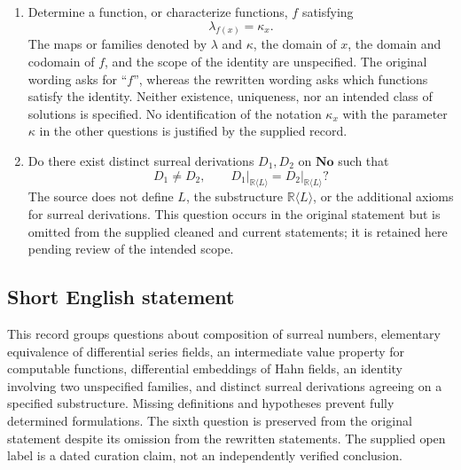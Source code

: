 \documentclass[11pt]{article}
\begin{document}
\begin{enumerate}
\item Determine a function, or characterize functions, \(f\) satisfying
\[
\lambda_{f(x)}=\kappa_x.
\]
The maps or families denoted by \(\lambda\) and \(\kappa\), the domain of \(x\), the domain and codomain of \(f\), and the scope of the identity are unspecified. The original wording asks for ``\(f\)'', whereas the rewritten wording asks which functions satisfy the identity. Neither existence, uniqueness, nor an intended class of solutions is specified. No identification of the notation \(\kappa_x\) with the parameter \(\kappa\) in the other questions is justified by the supplied record.

\item Do there exist distinct surreal derivations \(D_1,D_2\) on \(\mathbf{No}\) such that
\[
D_1\ne D_2,
\qquad
D_1\big|_{\mathbb{R}\langle L\rangle}
 =D_2\big|_{\mathbb{R}\langle L\rangle}?
\]
The source does not define \(L\), the substructure \(\mathbb{R}\langle L\rangle\), or the additional axioms for surreal derivations. This question occurs in the original statement but is omitted from the supplied cleaned and current statements; it is retained here pending review of the intended scope.
\end{enumerate}
\subsection{Short English statement}
This record groups questions about composition of surreal numbers, elementary equivalence of differential series fields, an intermediate value property for computable functions, differential embeddings of Hahn fields, an identity involving two unspecified families, and distinct surreal derivations agreeing on a specified substructure. Missing definitions and hypotheses prevent fully determined formulations. The sixth question is preserved from the original statement despite its omission from the rewritten statements. The supplied open label is a dated curation claim, not an independently verified conclusion.
\end{document}
